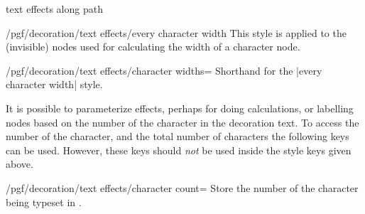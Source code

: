 \begin{decoration}{text effects along path}
    \begin{stylekey}{/pgf/decoration/text effects/every character width}
        This style is applied to the (invisible) nodes used for calculating the
        width of a character node.
    \end{stylekey}

    \begin{key}{/pgf/decoration/text effects/character widths=}
        Shorthand for the |every character width| style.
\begin{codeexample}[preamble={\usetikzlibrary{decorations.text}}]
\end{codeexample}
    \end{key}

    It is possible to parameterize effects, perhaps for doing calculations, or
    labelling nodes based on the number of the character in the decoration
    text. To access the number of the character, and the total number of
    characters the following keys can be used. However, these keys should
    \emph{not} be used inside the style keys given above.

    \begin{key}{/pgf/decoration/text effects/character count=}
        Store the number of the character being typeset in .
\begin{codeexample}[preamble={\usetikzlibrary{decorations.text}}]
\end{codeexample}
    \end{key}


\end{decoration}

